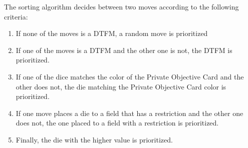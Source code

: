 The sorting algorithm decides between two moves according to the following criteria:
\begin{enumerate}
    \item If none of the moves is a DTFM, a random move is prioritized
    \item If one of the moves is a DTFM and the other one is not, the DTFM is prioritized. 
    \item If one of the dice matches the color of the Private Objective Card and the other does not, the die matching the Private Objective Card color is prioritized.
    \item If one move places a die to a field that has a restriction and the other one does not, the one placed to a field with a restriction is prioritized.
    \item Finally, the die with the higher value is prioritized.
\end{enumerate}
